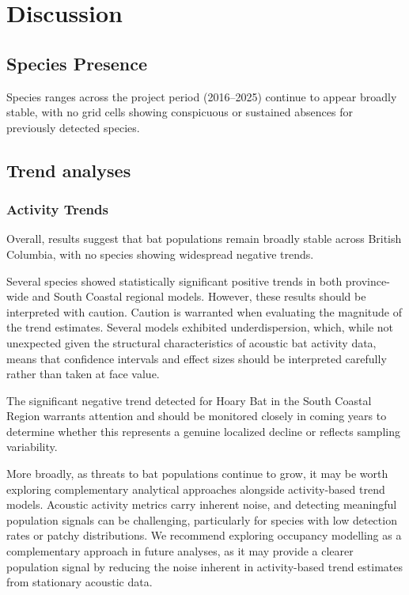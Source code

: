 \documentclass[
  letterpaper,
  DIV=11,
  numbers=noendperiod]{scrartcl}
\begin{document}
\section{Discussion}\label{discussion}

\subsection{Species Presence}\label{species-presence}

Species ranges across the project period (2016--2025) continue to appear
broadly stable, with no grid cells showing conspicuous or sustained
absences for previously detected species.

\subsection{Trend analyses}\label{trend-analyses}

\subsubsection{Activity Trends}\label{activity-trends-1}

Overall, results suggest that bat populations remain broadly stable
across British Columbia, with no species showing widespread negative
trends.

Several species showed statistically significant positive trends in both
province-wide and South Coastal regional models. However, these results
should be interpreted with caution. Caution is warranted when evaluating
the magnitude of the trend estimates. Several models exhibited
underdispersion, which, while not unexpected given the structural
characteristics of acoustic bat activity data, means that confidence
intervals and effect sizes should be interpreted carefully rather than
taken at face value.

The significant negative trend detected for Hoary Bat in the South
Coastal Region warrants attention and should be monitored closely in
coming years to determine whether this represents a genuine localized
decline or reflects sampling variability.

More broadly, as threats to bat populations continue to grow, it may be
worth exploring complementary analytical approaches alongside
activity-based trend models. Acoustic activity metrics carry inherent
noise, and detecting meaningful population signals can be challenging,
particularly for species with low detection rates or patchy
distributions. We recommend exploring occupancy modelling as a
complementary approach in future analyses, as it may provide a clearer
population signal by reducing the noise inherent in activity-based trend
estimates from stationary acoustic data.
\end{document}
